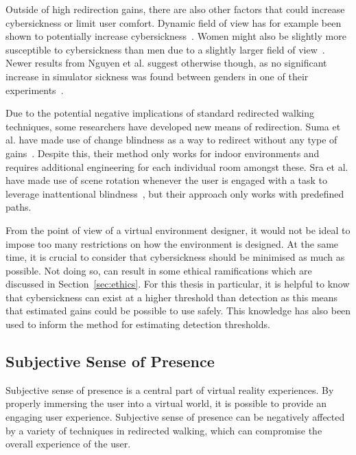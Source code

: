 Outside of high redirection gains, there are also other factors that could increase cybersickness or limit user comfort. Dynamic field of view has for example been shown to potentially increase cybersickness~\cite{norouzi2018assessing}. Women might also be slightly more susceptible to cybersickness than men due to a slightly larger field of view~\cite{hildebrandt2018get}. Newer results from Nguyen et al. suggest otherwise though, as no significant increase in simulator sickness was found between genders in one of their experiments~\cite{nguyen2018individual}.

Due to the potential negative implications of standard redirected walking techniques, some researchers have developed new means of redirection. Suma et al. have made use of change blindness as a way to redirect without any type of gains~\cite{suma2011leveraging}. Despite this, their method only works for indoor environments and requires additional engineering for each individual room amongst these. Sra et al. have made use of scene rotation whenever the user is engaged with a task to leverage inattentional blindness~\cite{sra2018vmotion}, but their approach only works with predefined paths. 

From the point of view of a virtual environment designer, it would not be ideal to impose too many restrictions on how the environment is designed. At the same time, it is crucial to consider that cybersickness should be minimised as much as possible. Not doing so, can result in some ethical ramifications which are discussed in Section~\ref{sec:ethics}. For this thesis in particular, it is helpful to know that cybersickness can exist at a higher threshold than detection as this means that estimated gains could be possible to use safely. This knowledge has also been used to inform the method for estimating detection thresholds. 

\subsection{Subjective Sense of Presence}
Subjective sense of presence is a central part of virtual reality experiences. By properly immersing the user into a virtual world, it is possible to provide an engaging user experience. Subjective sense of presence can be negatively affected by a variety of techniques in redirected walking, which can compromise the overall experience of the user. 

